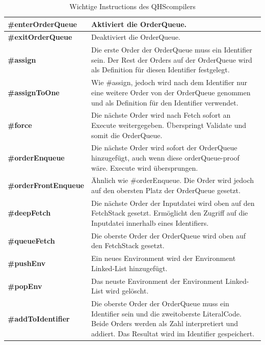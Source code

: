 \begin{table}[H]
    \centering
    \caption{Wichtige Instructions des QHScompilers}
    \label{tab:important_instructions}
    \vspace{3mm} %
    
    \begin{tabularx}{\textwidth}{l|X}
    \textbf{\#enterOrderQueue}      & Aktiviert die OrderQueue. \\ \hline
    \textbf{\#exitOrderQueue}       & Deaktiviert die OrderQueue. \\ \hline
    \textbf{\#assign}               & Die erste Order der OrderQueue muss ein Identifier sein. Der Rest der Orders auf der OrderQueue wird als Definition für diesen Identifier festgelegt. \\ \hline
    \textbf{\#assignToOne}          & Wie \#assign, jedoch wird nach dem Identifier nur eine weitere Order von der OrderQueue genommen und als Definition für den Identifier verwendet. \\ \hline
    \textbf{\#force}                & Die nächste Order wird nach Fetch sofort an Execute weitergegeben. Überspringt Validate und somit die OrderQueue. \\ \hline
    \textbf{\#orderEnqueue}         & Die nächste Order wird sofort der OrderQueue hinzugefügt, auch wenn diese orderQueue-proof wäre. Execute wird übersprungen. \\ \hline
    \textbf{\#orderFrontEnqueue}    & Ähnlich wie \#orderEnqueue. Die Order wird jedoch auf den obersten Platz der OrderQueue gesetzt. \\ \hline
    \textbf{\#deepFetch}            & Die nächste Order der Inputdatei wird oben auf den FetchStack gesetzt. Ermöglicht den Zugriff auf die Inputdatei innerhalb eines Identifiers. \\ \hline
    \textbf{\#queueFetch}           & Die oberste Order der OrderQueue wird oben auf den FetchStack gesetzt. \\ \hline 
    \textbf{\#pushEnv}              & Ein neues Environment wird der Environment Linked-List hinzugefügt. \\ \hline
    \textbf{\#popEnv}               & Das neuste Environment der Environment Linked-List wird gelöscht. \\ \hline
    \textbf{\#addToIdentifier}      & Die oberste Order der OrderQueue muss ein Identifier sein und die zweitoberste LiteralCode. Beide Orders werden als Zahl interpretiert und addiert.
                                      Das Resultat wird im Identifier gespeichert.       
    \end{tabularx}
\end{table}

